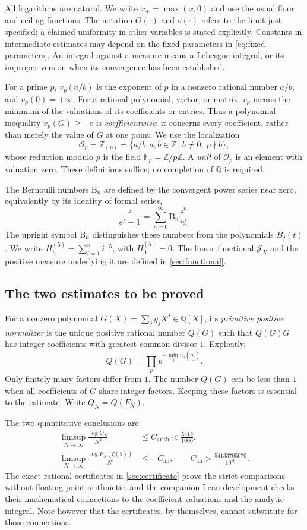 \documentclass[11pt,letterpaper]{article}
\theoremstyle{definition}
\newcommand{\Q}{\mathbb Q}
\newcommand{\Z}{\mathbb Z}
\newcommand{\Fp}{\mathbb F_p}
\newcommand{\J}{\mathcal J}
\newcommand{\arith}{\mathrm{arith}}
\newcommand{\an}{\mathrm{an}}
\begin{document}
All logarithms are natural. We write $x_+=\max(x,0)$ and use the usual floor
and ceiling functions. The notation $O(\cdot)$ and $o(\cdot)$ refers to the
limit just specified; a claimed uniformity in other variables is stated
explicitly. Constants in intermediate estimates may depend on the fixed
parameters in \eqref{eq:fixed-parameters}. An integral against a measure means
a Lebesgue integral, or its improper version when its convergence has been
established.

For a prime $p$, $v_p(a/b)$ is the exponent of $p$ in a nonzero rational
number $a/b$, and $v_p(0)=+\infty$. For a rational polynomial, vector, or
matrix, $v_p$ means the minimum of the valuations of its coefficients or
entries. Thus a polynomial inequality $v_p(G)\ge -e$ is
\emph{coefficientwise}: it concerns every coefficient, rather than merely the value
of $G$ at one point. We use the localization
\[
 \mathcal O_p=\Z_{(p)}
 =\{a/b:a,b\in\Z,\ b\ne0,\ p\nmid b\},
\]
whose reduction modulo $p$ is the field $\Fp=\Z/p\Z$. A \emph{unit} of
$\mathcal O_p$ is an element with valuation zero. These definitions suffice;
no completion of $\Q$ is required.

The Bernoulli numbers $\mathrm B_n$ are defined by the convergent power
series near zero, equivalently by its identity of formal series,
\[
 \frac{z}{e^z-1}=\sum_{n=0}^{\infty}\mathrm B_n\frac{z^n}{n!}.
\]
The upright symbol $\mathrm B_n$ distinguishes these numbers from the
polynomials $B_j(t)$. We write
$H_n^{(5)}=\sum_{i=1}^{n}i^{-5}$, with $H_0^{(5)}=0$.
The linear functional $\J_X$ and the positive measure underlying it are
defined in \cref{sec:functional}.

\subsection{The two estimates to be proved}
For a nonzero polynomial $G(X)=\sum_jg_jX^j\in\Q[X]$, its
\emph{primitive positive normalizer} is the unique positive rational number
$Q(G)$ such that $Q(G)G$ has integer coefficients with greatest common divisor
$1$. Explicitly,
\[
 Q(G)=\prod_p p^{-\min_j v_p(g_j)}.
\]
Only finitely many factors differ from $1$. The number $Q(G)$ can be less
than $1$ when all coefficients of $G$ share integer factors. Keeping these
factors is essential to the estimate. Write $Q_N=Q(F_N)$.

The two quantitative conclusions are
\begin{align}
 \limsup_{N\to\infty}\frac{\log Q_N}{N^2}
    &\le C_{\arith}<\frac{5412}{1000},\label{eq:plan-arith}\\
 \limsup_{N\to\infty}\frac{\log F_N(\zeta(5))}{N^2}
    &\le -C_{\an},\qquad
       C_{\an}>\frac{54133705070}{10^{10}}.
       \label{eq:plan-analytic}
\end{align}
The exact rational certificates in \cref{sec:certificate} prove the
strict comparisons without floating-point arithmetic, and the companion
Lean development \cite{zeta5lean2026} checks their mathematical
connections to the coefficient valuations and the analytic integral. Note however that the certificates, by themselves, cannot substitute for those connections.
\end{document}
